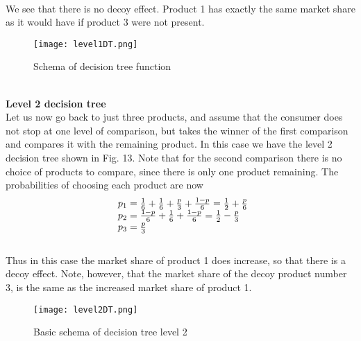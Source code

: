 \\
We see that there is no decoy effect. Product 1 has exactly the same market share as it would have if product 3 were not present.\\
\begin{figure}[h!]
	\begin{center}
		\texttt{[image: level1DT.png]}
	\end{center}
	\caption{Schema of decision tree function}
	\label{Decision tree level 1}
\end{figure}
\\
\textbf{Level 2 decision tree}\\
Let us now go back to just three products, and assume that the consumer does not stop at one level of comparison,
but takes the winner of the first comparison and compares it with the remaining product. In this case
we have the level 2 decision tree shown in Fig. 13. Note that for the second comparison there is no
choice of products to compare, since there is only one product remaining. The probabilities of choosing each product are now\\
\begin{equation} \label{eq:14}
\begin{array}{l@{}l}
p_1 = \frac{1}{6}+\frac{1}{6}+\frac{p}{3}+\frac{1-p}{6}=\frac{1}{2}+\frac{p}{6} \\
p_2 = \frac{1-p}{6}+\frac{1}{6}+\frac{1-p}{6}=\frac{1}{2}-\frac{p}{3} \\
p_3 = \frac{p}{3}
\end{array}
\end{equation}
\\
Thus in this case the market share of product 1 does increase, so that there is a decoy effect.
Note, however, that the market share of the decoy product number 3, is the same as the increased market share of product 1.
\\
\begin{figure}[h!]
	\begin{center}
		\texttt{[image: level2DT.png]}
	\end{center}
	\caption{Basic schema of decision tree level 2}
	\label{Decision tree level 2}
\end{figure}
\newpage
